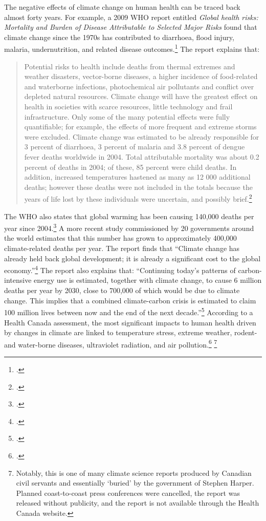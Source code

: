 The negative effects of climate change on human health can be traced back almost forty years. 
For example, a 2009 WHO report entitled \emph{Global health risks: Mortality and Burden of Disease Attributable to Selected Major Risks} found that climate change since the 1970s has contributed to diarrhoea, flood injury, malaria, undernutrition, and related disease outcomes.\footcite[][p. 44]{WHOGlobalHealthRisks}
The report explains that:
\begin{quote}
Potential risks to health include deaths from thermal extremes and weather disasters, vector-borne diseases, a higher incidence of food-related and waterborne infections, photochemical air pollutants and conflict over depleted natural resources. Climate change will have the greatest effect on health in societies with scarce resources, little technology and frail infrastructure. Only some of the many potential effects were fully quantifiable; for example, the effects of more frequent and extreme storms were excluded. Climate change was estimated to be already responsible for 3 percent of diarrhoea, 3 percent of malaria and 3.8 percent of dengue fever deaths worldwide in 2004. Total attributable mortality was about 0.2 percent of deaths in 2004; of these, 85 percent were child deaths. In addition, increased temperatures hastened as many as 12 000 additional deaths; however these deaths were not included in the totals because the years of life lost by these individuals were uncertain, and possibly brief.\footcite[][p. 24]{WHOGlobalHealthRisks}
\end{quote}
The WHO also states that global warming has been causing 140,000 deaths per year since 2004.\footcite[][]{WHOCCandHealth2012}
A more recent study commissioned by 20 governments around the world estimates that this number has grown to approximately 400,000 climate-related deaths per year.
The report finds that ``Climate change has already held back global development; it is already a significant cost to the global economy.''\footcite[][p. 16]{DARACVM}
The report also explains that: ``Continuing today's patterns of carbon-intensive energy use is estimated, together with climate 
change, to cause 6 million deaths per year by 2030, close to 700,000 of which would be due to climate change. This implies that a combined climate-carbon crisis is estimated to claim 100 million lives between now and the end of the next decade.''\footcite[][p. 17]{DARACVM}
According to a Health Canada assessment, the most significant impacts to human health driven by changes in climate are linked to temperature stress, extreme weather, rodent- and water-borne diseases, ultraviolet radiation, and air pollution.\footcite[][]{HHInACC} \footnote{Notably, this is one of many climate science reports produced by Canadian civil servants and essentially `buried' by the government of Stephen Harper. Planned coast-to-coast press conferences were cancelled, the report was released without publicity, and the report is not available through the Health Canada website.}
